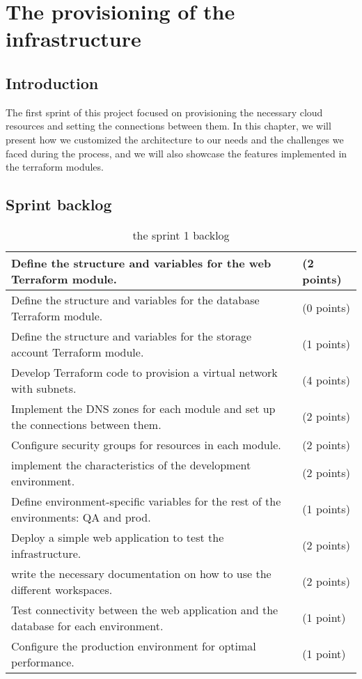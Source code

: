 \chapter{The provisioning of the infrastructure}

\section*{Introduction}
\noindent
The first sprint of this project focused on provisioning the necessary cloud resources and setting the connections between them. In this chapter, we will present how we customized the architecture to our needs and the challenges we faced during the process, and we will also showcase the features implemented in the terraform modules.
\section{Sprint backlog}
\begin{longtable}[c]{
    |p{}|
    p{}|
    }
    \caption{the sprint 1 backlog}
    \label{tab:Sprint1_backlog}                                                                       \\
    \hline
    Define the structure and variables for the web Terraform module.                     & (2 points) \\
    \hline
    Define the structure and variables for the database Terraform module.                & (0 points) \\
    \hline
    Define the structure and variables for the storage account Terraform module.         & (1 points) \\
    \hline
    Develop Terraform code to provision a virtual network with subnets.                  & (4 points) \\
    \hline
    Implement the DNS zones for each module and set up the connections between them.     & (2 points) \\
    \hline
    Configure security groups for resources in each module.                              & (2 points) \\
    \hline
    implement the characteristics of the development environment.                        & (2 points) \\
    \hline
    Define environment-specific variables for the rest of the environments: QA and prod. & (1 points) \\
    \hline
    Deploy a simple web application to test the infrastructure.                          & (2 points) \\
    \hline
    write the necessary documentation on how to use the different workspaces.            & (2 points) \\
    \hline
    Test connectivity between the web application and the database for each environment. & (1 point)  \\
    \hline
    Configure the production environment for optimal performance.                        & (1 point)  \\
    \hline
\end{longtable}

